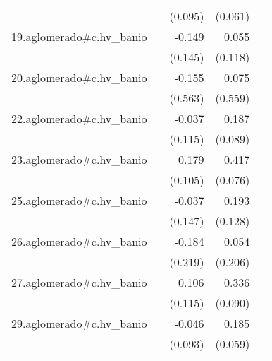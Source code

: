 {\begin{longtable}{l*{4}{D{.}{.}{-1}}}
            &                     &     (0.095)         &     (0.061)         &                     \\
\addlinespace
19.aglomerado#c.hv\_banio&                     &      -0.149         &       0.055         &                     \\
            &                     &     (0.145)         &     (0.118)         &                     \\
\addlinespace
20.aglomerado#c.hv\_banio&                     &      -0.155         &       0.075         &                     \\
            &                     &     (0.563)         &     (0.559)         &                     \\
\addlinespace
22.aglomerado#c.hv\_banio&                     &      -0.037         &       0.187\sym{*}  &                     \\
            &                     &     (0.115)         &     (0.089)         &                     \\
\addlinespace
23.aglomerado#c.hv\_banio&                     &       0.179         &       0.417\sym{***}&                     \\
            &                     &     (0.105)         &     (0.076)         &                     \\
\addlinespace
25.aglomerado#c.hv\_banio&                     &      -0.037         &       0.193         &                     \\
            &                     &     (0.147)         &     (0.128)         &                     \\
\addlinespace
26.aglomerado#c.hv\_banio&                     &      -0.184         &       0.054         &                     \\
            &                     &     (0.219)         &     (0.206)         &                     \\
\addlinespace
27.aglomerado#c.hv\_banio&                     &       0.106         &       0.336\sym{***}&                     \\
            &                     &     (0.115)         &     (0.090)         &                     \\
\addlinespace
29.aglomerado#c.hv\_banio&                     &      -0.046         &       0.185\sym{**} &                     \\
            &                     &     (0.093)         &     (0.059)         &                     \\

\end{longtable}}
